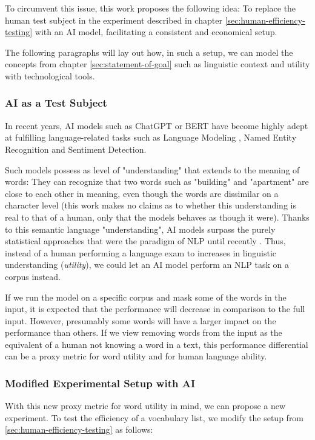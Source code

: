 To circumvent this issue, this work proposes the following idea:
To replace the human test subject in the experiment described in chapter \ref{sec:human-efficiency-testing} with an AI model, facilitating a consistent and economical setup.

The following paragraphs will lay out how, in such a setup, we can model the concepts from chapter \ref{sec:statement-of-goal} such as linguistic context and utility with technological tools.

\subsubsection{AI as a Test Subject} \label{sec:ai-as-test-subject}
In recent years, AI models such as ChatGPT  or BERT  have become highly adept at fulfilling language-related tasks such as Language Modeling , Named Entity Recognition and Sentiment Detection.

Such models possess as level of "understanding" that extends to the meaning of words:
They can recognize that two words such as "building" and "apartment" are close to each other in meaning, even though the words are dissimilar on a character level (this work makes no claims as to whether this understanding is real to that of a human, only that the models behaves as though it were).
Thanks to this semantic language "understanding", AI models surpass the purely statistical approaches that were the paradigm of NLP until recently .
Thus, instead of a human performing a language exam to increases in linguistic understanding (\textit{utility}), we could let an AI model perform an NLP task on a corpus instead.

If we run the model on a specific corpus and mask some of the words in the input, it is expected that the performance will decrease in comparison to the full input.
However, presumably some words will have a larger impact on the performance than others.
If we view removing words from the input as the equivalent of a human not knowing a word in a text, this performance differential can be a proxy metric for word utility and for human language ability.

\subsubsection{Modified Experimental Setup with AI}
With this new proxy metric for word utility in mind, we can propose a new experiment.
To test the efficiency of a vocabulary list, we modify the setup from \ref{sec:human-efficiency-testing} as follows:

